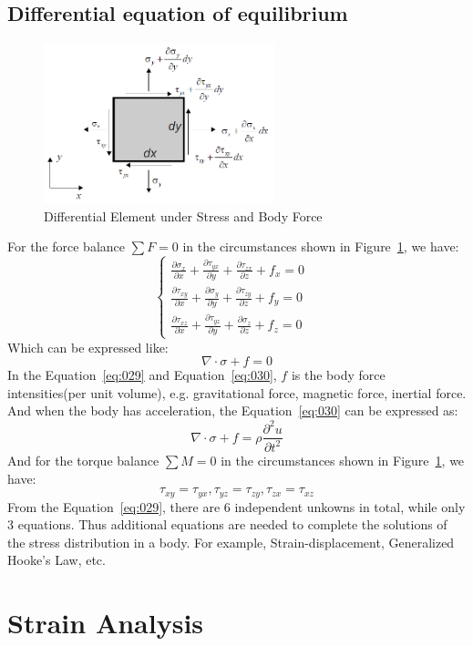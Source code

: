 \documentclass[en,hazy,cyan,8pt,normal]{elegantnote}
\begin{document}
  \subsection{Differential equation of equilibrium}
    \begin{figure}[H]
      \centering
      \includegraphics[width=0.6\textwidth]{image/009.png}
      \caption{Differential Element under Stress and Body Force}
      \label{fig:009}
    \end{figure}
    For the force balance $\sum F=0$ in the circumstances shown in Figure~\ref{fig:009}, we have:
    \begin{equation}\label{eq:029}
      \begin{cases}
        \displaystyle \frac{\partial\sigma_x}{\partial x}+\frac{\partial\tau_{yx}}{\partial y}+\frac{\partial\tau_{zx}}{\partial z}+f_x=0 \\
        \displaystyle \frac{\partial\tau_{xy}}{\partial x}+\frac{\partial\sigma_y}{\partial y}+\frac{\partial\tau_{zy}}{\partial z}+f_y=0 \\
        \displaystyle \frac{\partial\tau_{xz}}{\partial x}+\frac{\partial\tau_{yz}}{\partial y}+\frac{\partial\sigma_z}{\partial z}+f_z=0 &
      \end{cases}
    \end{equation}
    Which can be expressed like:
    \begin{equation}\label{eq:030}
      \nabla \cdot \sigma + f = 0
    \end{equation}
    In the Equation~\ref{eq:029} and Equation~\ref{eq:030}, $f$ is the body force intensities(per unit volume), e.g. gravitational force, magnetic force, inertial force.\\
    And when the body has acceleration, the Equation~\ref{eq:030} can be expressed as:
    \begin{equation}\label{eq:031}
      \nabla \cdot \sigma + f = \rho \frac{\partial^2 u}{\partial t^2}
    \end{equation}
    And for the torque balance $\sum M=0$ in the circumstances shown in Figure~\ref{fig:009}, we have:
    \begin{equation}\label{eq:032}
        \tau_{xy}=\tau_{yx}, \tau_{yz}=\tau_{zy}, \tau_{zx}=\tau_{xz}
    \end{equation}
    From the Equation~\ref{eq:029}, there are 6 independent unkowns in total, while only 3 equations. Thus additional equations are needed to complete the solutions of the stress distribution in a body. For example, Strain-displacement, Generalized Hooke's Law, etc.

\section{Strain Analysis}
\end{document}
